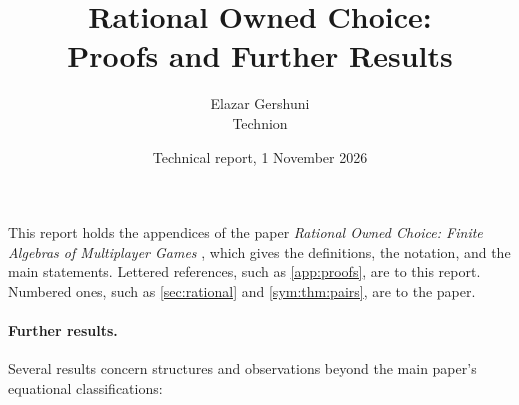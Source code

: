\documentclass[11pt]{article}
\title{Rational Owned Choice:\\Proofs and Further Results}
\author{Elazar Gershuni\\Technion}
\date{Technical report, 1 November 2026}
\begin{document}
\maketitle
\appendix
{}

\noindent This report holds the appendices of the paper \emph{Rational Owned Choice: Finite Algebras of Multiplayer Games} \cite{GershuniOwnedChoice2026}, which gives the definitions, the notation, and the main statements. Lettered references, such as \cref{app:proofs}, are to this report. Numbered ones, such as \cref{sec:rational} and \cref{sym:thm:pairs}, are to the paper.

\paragraph{Further results.}
Several results concern structures and observations beyond the main paper's
equational classifications:
\end{document}

